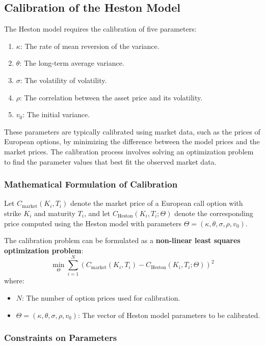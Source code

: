 \documentclass[11pt, oneside, a4paper, titlepage]{report}
\begin{document}
\subsection{Calibration of the Heston Model}

The Heston model requires the calibration of five parameters:
\begin{enumerate}
    \item \( \kappa \): The rate of mean reversion of the variance.
    \item \( \theta \): The long-term average variance.
    \item \( \sigma \): The volatility of volatility.
    \item \( \rho \): The correlation between the asset price and its volatility.
    \item \( v_0 \): The initial variance.
\end{enumerate}

These parameters are typically calibrated using market data, such as the prices of European options, by minimizing the difference between the model prices and the market prices. The calibration process involves solving an optimization problem to find the parameter values that best fit the observed market data.

\subsubsection{Mathematical Formulation of Calibration}

Let \( C_{\text{market}}(K_i, T_i) \) denote the market price of a European call option with strike \( K_i \) and maturity \( T_i \), and let \( C_{\text{Heston}}(K_i, T_i; \Theta) \) denote the corresponding price computed using the Heston model with parameters \( \Theta = (\kappa, \theta, \sigma, \rho, v_0) \).

The calibration problem can be formulated as a \textbf{non-linear least squares optimization problem}:
\[
\min_{\Theta} \sum_{i=1}^N \left( C_{\text{market}}(K_i, T_i) - C_{\text{Heston}}(K_i, T_i; \Theta) \right)^2
\]
where:
\begin{itemize}
    \item \( N \): The number of option prices used for calibration.
    \item \( \Theta = (\kappa, \theta, \sigma, \rho, v_0) \): The vector of Heston model parameters to be calibrated.
\end{itemize}

\subsubsection{Constraints on Parameters}
\end{document}
